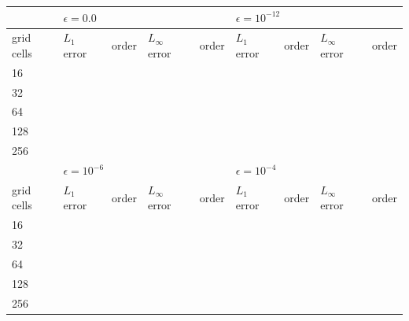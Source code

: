 \documentclass{article}
\begin{document}
        \begin{center}\vspace{1cm}
        \begin{tabular}{|l|l|l|l|l|l|l|l|l|}
        \hline
                   & \multicolumn{4}{l|}{$\epsilon = 0.0$}              & \multicolumn{4}{l|}{$\epsilon = 10^{-12}$}         \\ \hline
        grid cells & $L_{1}$ error & order & $L_{\infty}$ error & order & $L_{1}$ error & order & $L_{\infty}$ error & order \\ \hline
        16         &               &       &                    &       &               &       &                    &       \\ \hline
        32         &               &       &                    &       &               &       &                    &       \\ \hline
        64         &               &       &                    &       &               &       &                    &       \\ \hline
        128        &               &       &                    &       &               &       &                    &       \\ \hline
        256        &               &       &                    &       &               &       &                    &       \\ \hline
                   & \multicolumn{4}{l|}{$\epsilon = 10^{-6}$}          & \multicolumn{4}{l|}{$\epsilon = 10^{-4}$}          \\ \hline
        grid cells & $L_{1}$ error & order & $L_{\infty}$ error & order & $L_{1}$ error & order & $L_{\infty}$ error & order \\ \hline
        16         &               &       &                    &       &               &       &                    &       \\ \hline
        32         &               &       &                    &       &               &       &                    &       \\ \hline
        64         &               &       &                    &       &               &       &                    &       \\ \hline
        128        &               &       &                    &       &               &       &                    &       \\ \hline
        256        &               &       &                    &       &               &       &                    &       \\ \hline
        \end{tabular}
        \end{center}\vspace{1cm}
\end{document}
